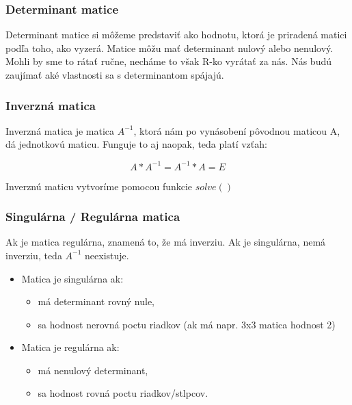 \hypertarget{determinant-matice}{%
\subsubsection{Determinant matice}\label{determinant-matice}}

Determinant matice si môžeme predstaviť ako hodnotu, ktorá je priradená
matici podľa toho, ako vyzerá. Matice môžu mať determinant nulový alebo
nenulový. Mohli by sme to rátať ručne, necháme to však R-ko vyrátať za
nás. Nás budú zaujímať aké vlastnosti sa s determinantom spájajú.

\begin{Shaded}
\begin{Highlighting}[]
\end{Highlighting}
\end{Shaded}

\hypertarget{inverznuxe1-matica}{%
\subsubsection{Inverzná matica}\label{inverznuxe1-matica}}

Inverzná matica je matica \(A^{-1}\), ktorá nám po vynásobení pôvodnou
maticou A, dá jednotkovú maticu. Funguje to aj naopak, teda platí vzťah:

\[A * A^{-1} = A^{-1} * A = E\]

Inverznú maticu vytvoríme pomocou funkcie \(solve()\)

\hypertarget{singuluxe1rna-reguluxe1rna-matica}{%
\subsubsection{Singulárna / Regulárna
matica}\label{singuluxe1rna-reguluxe1rna-matica}}

Ak je matica regulárna, znamená to, že má inverziu. Ak je singulárna,
nemá inverziu, teda \(A^{-1}\) neexistuje.

\begin{itemize}
\tightlist
\item
  Matica je singulárna ak:

  \begin{itemize}
  \tightlist
  \item
    má determinant rovný nule,
  \item
    sa hodnost nerovná poctu riadkov (ak má napr. 3x3 matica hodnost 2)
  \end{itemize}
\item
  Matica je regulárna ak:

  \begin{itemize}
  \tightlist
  \item
    má nenulový determinant,
  \item
    sa hodnost rovná poctu riadkov/stlpcov.
  \end{itemize}
\end{itemize}

